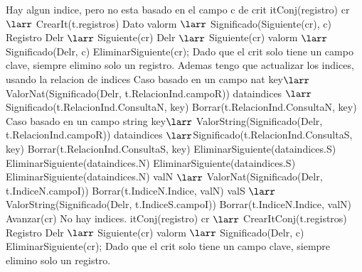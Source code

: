 {		\Else
			\State Hay algun indice, pero no esta basado en el campo c de crit
			\State itConj(registro) cr $\larr$ CrearIt(t.registros)
			\State Dato valorm $\larr$ Significado(Siguiente(cr), c)
			\State Registro Delr $\larr$ Siguiente(cr)
					\State Delr $\larr$ Siguiente(cr)
					\State valorm $\larr$ Significado(Delr, c)		
						\State EliminarSiguiente(cr);									
						\State Dado que el crit solo tiene un campo clave, siempre elimino solo un registro.
						\State Ademas tengo que actualizar los indices, usando la relacion de indices
								\State Caso basado en un campo nat
								\State key$\larr$ ValorNat(Significado(Delr, t.RelacionInd.campoR))
								\State dataindices $\larr$Significado(t.RelacionInd.ConsultaN, key)
								\State Borrar(t.RelacionInd.ConsultaN, key)
							\Else
								\State Caso basado en un campo string
								\State key$\larr$ ValorString(Significado(Delr, t.RelacionInd.campoR))
								\State dataindices $\larr$Significado(t.RelacionInd.ConsultaS, key)
								\State Borrar(t.RelacionInd.ConsultaS, key)
							\EndIf						
								\State EliminarSiguiente(dataindices.S)
								\State EliminarSiguiente(dataindices.N)
							\Else
									\State EliminarSiguiente(dataindices.S)
								\Else
										\State EliminarSiguiente(dataindices.N)
									\EndIf
								\EndIf
							\EndIf
								\State valN $\larr$ ValorNat(Significado(Delr, t.IndiceN.campoI))
								\State Borrar(t.IndiceN.Indice, valN)
							\EndIf
								\State valS $\larr$ ValorString(Significado(Delr, t.IndiceS.campoI))
								\State Borrar(t.IndiceN.Indice, valN)
							\EndIf
						\EndIf
					\EndIf
					\State Avanzar(cr)													
			\EndWhile
		\EndIf	
	\Else
		\State No hay indices.
		\State itConj(registro) cr $\larr$ CrearItConj(t.registros)
			\State Registro Delr $\larr$ Siguiente(cr)
			\State valorm $\larr$ Significado(Delr, c)		
				\State EliminarSiguiente(cr);									
				\State Dado que el crit solo tiene un campo clave, siempre elimino solo un registro.
}
